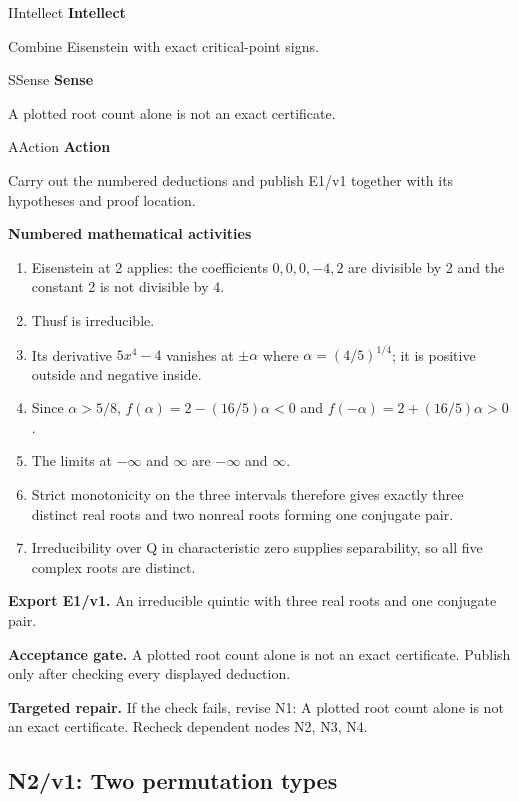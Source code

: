 \documentclass[preprint,12pt,aps,pra,showkeys,amsmath,amssymb,superscriptaddress,floatfix]{revtex4-2}
\theoremstyle{definition}
\theoremstyle{remark}
\newcommand{\mmfaculty}[3]{%
 \begin{mmfacultybox}{#1}{#2}
 {\sffamily\bfseries\color{MMBlue}#2}\par\smallskip #3
 \end{mmfacultybox}}
\newcommand{\field}[2]{\par\smallskip\noindent\textbf{#1.} #2\par}
\begin{document}
\mmfaculty{I}{Intellect}{Combine Eisenstein with exact critical-point signs.}

\mmfaculty{S}{Sense}{A plotted root count alone is not an exact certificate.}

\mmfaculty{A}{Action}{Carry out the numbered deductions and publish E1/v1 together with its
hypotheses and proof location.}

\smallskip\noindent\textbf{Numbered mathematical activities}

\begin{enumerate}[label=N1.\arabic*,leftmargin=3.4em]

\item Eisenstein at 2 applies: the coefficients \(0,0,0,-4,2\) are divisible
by 2 and the constant 2 is not divisible by 4.

\item Thusf is irreducible.

\item Its derivative \(5x^{4}-4\) vanishes at \(\pm \alpha\) where
\(\alpha =(4/5)^{1/4}\); it is positive outside and negative inside.

\item Since \(\alpha >5/8\), \(f(\alpha )=2-(16/5)\alpha <0\) and
\(f(-\alpha )=2+(16/5)\alpha >0\).

\item The limits at \(-\infty\) and \(\infty\) are \(-\infty\) and \(\infty\).

\item Strict monotonicity on the three intervals therefore gives exactly three
distinct real roots and two nonreal roots forming one conjugate pair.

\item Irreducibility over Q in characteristic zero supplies separability, so
all five complex roots are distinct.

\end{enumerate}

\field{Export E1/v1}{An irreducible quintic with three real roots and one conjugate pair.}

\field{Acceptance gate}{A plotted root count alone is not an exact certificate. Publish only
after checking every displayed deduction.}

\field{Targeted repair}{If the check fails, revise N1: A plotted root count alone is not an
exact certificate. Recheck dependent nodes N2, N3, N4.}

\clearpage

\subsection{N2/v1: Two permutation types}
\end{document}
